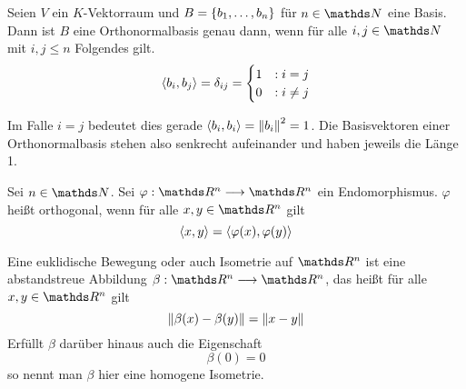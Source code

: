 		\begin{definition}[Orthonormalbasis]
			Seien $V$ ein $K$-Vektorraum und $B=\left\{ b_1,\ldots,b_n \right\}$ für $n\in\SN$ eine Basis.
			Dann ist $B$ eine Orthonormalbasis genau dann, wenn für alle $i,j\in\SN$ mit $i,j\leq n$ Folgendes gilt.	
			\[
				\left\langle b_i,b_j \right\rangle=\delta_{ij} =
				\begin{cases}
					1 &:i=j \\
					0 &:i\neq j
				\end{cases}
			\]
		\end{definition}

		Im Falle $i=j$ bedeutet dies gerade $\left\langle b_i,b_i \right\rangle = \left\| b_i \right\|^2 = 1$.
		Die Basisvektoren einer Orthonormalbasis stehen also senkrecht aufeinander und haben jeweils die Länge 1.

		\begin{definition}
			Sei $n\in\SN$.
			Sei $\varphi:\SR^n\longrightarrow\SR^n$ ein Endomorphismus.
			$\varphi$ heißt orthogonal, wenn für alle $x,y\in\SR^n$ gilt
			\[
				\left\langle x,y \right\rangle = \left\langle \varphi(x), \varphi(y) \right\rangle
			\]
		\end{definition}

		\begin{definition}[Isometrie]
			Eine euklidische Bewegung oder auch Isometrie auf $\SR^n$ ist eine abstandstreue Abbildung $\beta:\SR^n\longrightarrow\SR^n$,
			das heißt für alle $x,y\in\SR^n$ gilt
			\[
				\left\| \beta(x) - \beta(y) \right\| = \left\| x-y \right\|
			\]
			Erfüllt $\beta$ darüber hinaus auch die Eigenschaft
			\[
				\beta(0) = 0
			\]
			so nennt man $\beta$ hier eine homogene Isometrie.
		\end{definition}

